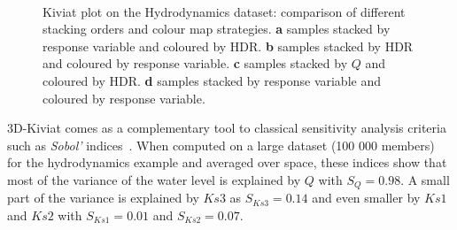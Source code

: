 \begin{figure}[!ht]
~
\caption{Kiviat plot on the Hydrodynamics dataset: comparison of different stacking orders and colour map strategies. \textbf{a} samples stacked by response variable and coloured by HDR. \textbf{b} samples stacked by HDR and coloured by response variable. \textbf{c} samples stacked by $Q$ and coloured by HDR. \textbf{d} samples stacked by response variable and coloured by response variable.}
\label{fig:Kiviat_order}
\end{figure}

3D-Kiviat comes as a complementary tool to classical sensitivity analysis criteria such as \emph{Sobol'} indices~\citep{Saltelli2007}. When computed on a large dataset (100 000 members) for the hydrodynamics example and averaged over space, these indices show that most of the variance of the water level is explained by $Q$ with $S_Q=0.98$. A small part of the variance is explained by $Ks3$ as $S_{Ks3} = 0.14$ and even smaller by $Ks1$ and $Ks2$ with $S_{Ks1}=0.01$ and $S_{Ks2} = 0.07$.

